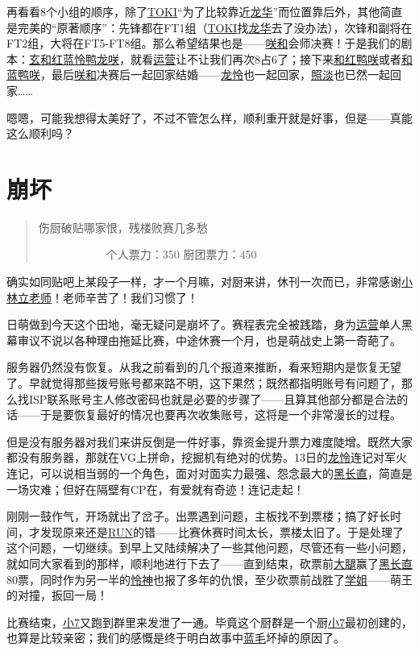 再看看8个小组的顺序，除了\uline{TOKI}“为了比较靠近\uline{龙华}”而位置靠后外，其他简直是完美的“原著顺序”：先锋都在FT1组（\uline{TOKI}找\uline{龙华}去了没办法），次锋和副将在FT2组，大将在FT5-FT8组。那么希望结果也是——\uline{咲}\uline{和}会师决赛！于是我们的剧本：\uline{玄和红蓝怜鸭龙咲}，就看\uline{运营}让不让我们再次8占6了；接下来\uline{和红鸭咲}或者\uline{和蓝鸭咲}，最后\uline{咲}\uline{和}决赛后一起回家结婚——\uline{龙}\uline{怜}也一起回家，\uline{照淡}也已然一起回家……

嗯嗯，可能我想得太美好了，不过不管怎么样，顺利重开就是好事，但是——真能这么顺利吗？

\chapter{崩坏}
\begin{quote}
伤厨破贴哪家恨，残楼败赛几多愁

　　　　　　个人票力：350 厨团票力：450
\end{quote}

确实如同贴吧上某段子一样，才一个月嘛，对厨来讲，休刊一次而已，非常感谢\uline{小林立老师}！老师辛苦了！我们习惯了！

日萌做到今天这个田地，毫无疑问是崩坏了。赛程表完全被践踏，身为\uline{运营}单人黑幕审议不说以各种理由拖延比赛，中途休赛一个月，也是萌战史上第一奇葩了。

服务器仍然没有恢复。从我之前看到的几个报道来推断，看来短期内是恢复无望了。早就觉得那些拨号账号都来路不明，这下果然；既然都指明账号有问题了，那么找ISP联系账号主人修改密码也就是必要的步骤了——且算其他部分都是合法的话——于是要恢复最好的情况也要再次收集账号，这将是一个非常漫长的过程。

但是没有服务器对我们来讲反倒是一件好事，靠资金提升票力难度陡增。既然大家都没有服务器，那就在VG上拼命，挖掘机有绝对的优势。13日的\uline{龙}\uline{怜}连记对军火连记，可以说相当弱的一个角色，面对对面实力最强、怨念最大的\uline{黑长直}，简直是一场灾难；但好在隔壁有CP在，有爱就有奇迹！连记走起！

刚刚一鼓作气，开场就出了岔子。出票遇到问题，主板找不到票楼；搞了好长时间，才发现原来还是\uline{RUN}的错——比赛休赛时间太长，票楼太旧了。于是处理了这个问题，一切继续。到早上又陆续解决了一些其他问题，尽管还有一些小问题，就如同大家看到的那样，顺利地进行下去了——直到结束，砍票前\uline{大腿}赢了\uline{黑长直}80票，同时作为另一半的\uline{怜神}也报了多年的仇恨，至少砍票前战胜了\uline{学姐}——萌王的对撞，扳回一局！

比赛结束，\uline{小7}又跑到群里来发泄了一通。毕竟这个厨群是一个厨\uline{小7}最初创建的，也算是比较亲密；我们的感慨是终于明白故事中\uline{蓝毛}坏掉的原因了。

